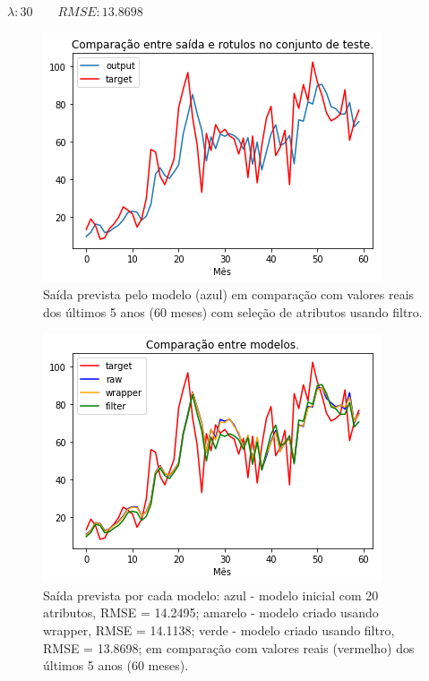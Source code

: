 \documentclass[a4paper, 12pt]{article}
\begin{document}
$\lambda: 30 \quad\quad RMSE: 13.8698$

\begin{figure}[h!]
    \centering
  \includegraphics[width=10cm]{images/filter.png}
    \caption{Saída prevista pelo modelo (azul) em comparação com valores reais dos últimos 5 anos (60 meses) com seleção de atributos usando filtro.}
\end{figure}

\begin{figure}[h!]
    \centering
  \includegraphics[width=10cm]{images/comparison.png}
    \caption{Saída prevista por cada modelo: azul - modelo inicial com 20 atributos, RMSE = 14.2495; amarelo - modelo criado usando wrapper, RMSE = 14.1138; verde - modelo criado usando filtro, RMSE = 13.8698;  em comparação com valores reais (vermelho) dos últimos 5 anos (60 meses).}
\end{figure}
\end{document}
